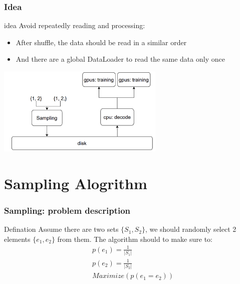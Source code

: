 \documentclass[notheorems, aspectratio=54]{beamer}
\begin{document}
\begin{frame}
    \frametitle{Idea}
    \begin{block}{idea}
        Avoid repeatedly reading and processing:
        \begin{itemize}
            \item After shuffle, the data should be read in a similar order
            \item And there are a global DataLoader to read the same data only once
        \end{itemize}
    \end{block}
    \centering
    \includegraphics[width=8cm]{global_img_dir/global_sampling.png}
\end{frame}

\section{Sampling Alogrithm}
\begin{frame}
    \frametitle{Sampling: problem description}
    \begin{block}{Defination}
        Assume there are two sets $\{S_1, S_2\}$, we should randomly select 2 elements $\{e_1, e_2\}$ from them.
        The algorithm should to make sure to:
        \begin{equation}
            \begin{aligned}
                & p(e_1) = \frac{1}{|S_1|}\\
                & p(e_2) = \frac{1}{|S_2|}\\
                & Maximize ( { p(e_1 = e_2) } )
            \end{aligned}
            \end{equation}
    \end{block}
    
\end{frame}
\end{document}
